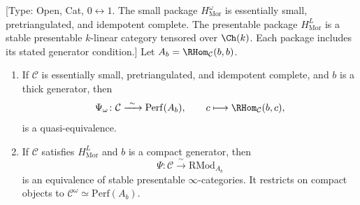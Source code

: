 \begin{theorem}
\label{prop:morita-equivalence-compact-gen}
\textup{[Type: Open, Cat, $0\leftrightarrow1$.  The small package
$H_{\mathrm{Mor}}^\omega$ is essentially small, pretriangulated, and
idempotent complete.  The presentable package $H_{\mathrm{Mor}}^L$ is
a stable presentable $k$-linear category tensored over $\Ch(k)$.
Each package includes its stated generator condition.]}
Let $A_b=\RHom_{\mathcal C}(b,b)$.
\begin{enumerate}[label=\textup{(\roman*)}]
\item If $\mathcal C$ is essentially small, pretriangulated, and
idempotent complete, and $b$ is a thick generator, then
\[
 \Psi_\omega\colon\mathcal C\xrightarrow{\ \sim\ }
 \mathrm{Perf}(A_b),
 \qquad c\longmapsto\RHom_{\mathcal C}(b,c),
\]
is a quasi-equivalence.
\item If $\mathcal C$ satisfies $H_{\mathrm{Mor}}^L$ and $b$ is a
compact generator, then
\[
 \Psi\colon\mathcal C\xrightarrow{\ \sim\ }
 \mathrm{RMod}_{A_b}
\]
is an equivalence of stable presentable $\infty$-categories.  It
restricts on compact objects to
$\mathcal C^\omega\simeq\mathrm{Perf}(A_b)$.
\end{enumerate}
\end{theorem}

